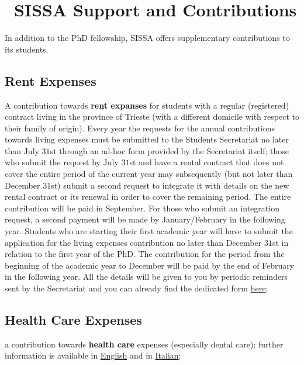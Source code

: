 \documentclass{sissavademecum}
\begin{document}
\chapter{\texorpdfstring{\faHandHoldingUsd\ }{}SISSA Support and Contributions}

In addition to the PhD fellowship, SISSA offers supplementary contributions to its students.

\section{Rent Expenses}
 A contribution towards \textbf{rent expanses} for students with a regular (registered) contract living in the province of Trieste (with a different domicile with respect to their family of origin). Every year the requests for the annual contributions towards living expenses must be submitted to the Students Secretariat no later than July $31$st through an ad-hoc form provided by the Secretariat itself; those who submit the request by July $31$st and have a rental contract that does not cover the entire period of the current year may subsequently (but not later than December $31$st) submit a second request to integrate it with details on the new rental contract or its renewal in order to cover the remaining period. The entire contribution will be paid in September. For those who submit an integration request, a second payment will be made by January/February in the following year. Students who are starting their first academic year will have to submit the application for the living expenses contribution no later than December $31$st in relation to the first year of the PhD. The contribution for the period from the beginning of the academic year to December will be paid by the end of February in the following year. All the details will be given to you by periodic reminders sent by the Secretariat and you can already find the dedicated form \href{http://wiki.sissa.it/students/index.php/Contribution_towards_living_expenses}{here};
 
     \section{Health Care Expenses} a contribution towards \textbf{health care} expenses (especially dental care); further information is available in \href{https://www.sissa.it/_media/documenti/english_regolamento_interventi.pdf}{English} and in \href{https://www.sissa.it/_media/documenti/regolamento-assistenziale.pdf}{Italian};
    
\end{document}
